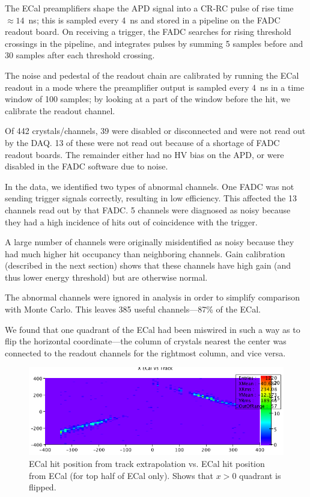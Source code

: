 
\vspace{1cm}{\bf ECal performance [Sho]}

The ECal preamplifiers shape the APD signal into a CR-RC pulse of rise time $\approx 14$~ns; this is sampled every 4~ns and stored in a pipeline on the FADC readout board.
On receiving a trigger, the FADC searches for rising threshold crossings in the pipeline, and integrates pulses by summing 5 samples before and 30 samples after each threshold crossing.

The noise and pedestal of the readout chain are calibrated by running the ECal readout in a mode where the preamplifier output is sampled every 4~ns in a time window of 100 samples; by looking at a part of the window before the hit, we calibrate the readout channel.

Of 442 crystals/channels, 39 were disabled or disconnected and were not read out by the DAQ. 
13 of these were not read out because of a shortage of FADC readout boards.
The remainder either had no HV bias on the APD, or were disabled in the FADC software due to noise.

In the data, we identified two types of abnormal channels. 
One FADC was not sending trigger signals correctly, resulting in low efficiency. This affected the 13 channels read out by that FADC.
5 channels were diagnosed as noisy because they had a high incidence of hits out of coincidence with the trigger.

A large number of channels were originally misidentified as noisy because they had much higher hit occupancy than neighboring channels.
Gain calibration (described in the next section) shows that these channels have high gain (and thus lower energy threshold) but are otherwise normal.

The abnormal channels were ignored in analysis in order to simplify comparison with Monte Carlo. This leaves 385 useful channels---87\% of the ECal.

We found that one quadrant of the ECal had been miswired in such a way as to flip the horizontal coordinate---the column of crystals nearest the center was connected to the readout channels for the rightmost column, and vice versa.

\begin{figure}[ht]
	\includegraphics[width=\textwidth]{test2012/ecalperformance/x_match_flip}
	\caption{\small{ECal hit position from track extrapolation vs. ECal hit position from ECal (for top half of ECal only). Shows that $x>0$ quadrant is flipped.}}
	\label{fig:x_flip}
\end{figure}

